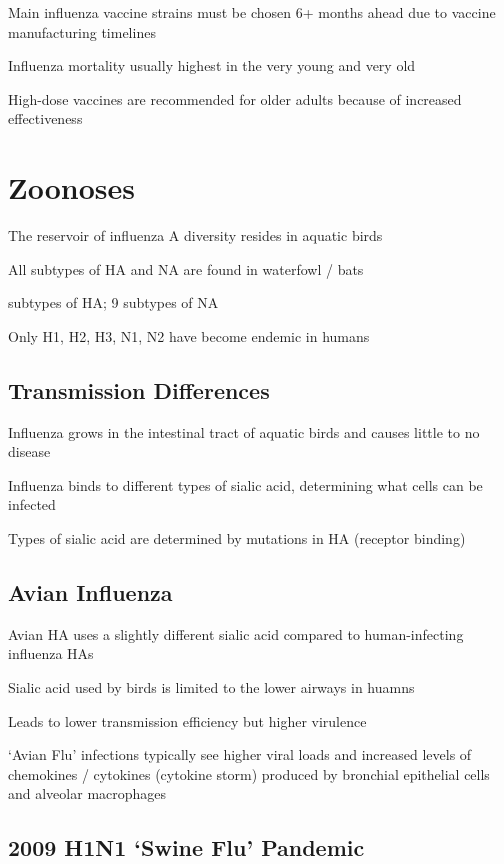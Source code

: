 \documentclass{notes}
\begin{document}
Main influenza vaccine strains must be chosen 6+ months ahead due to vaccine manufacturing timelines

Influenza mortality usually highest in the very young and very old

\tab High-dose vaccines are recommended for older adults because of increased effectiveness

\section{Zoonoses}

The reservoir of influenza A diversity resides in aquatic birds

\tab All subtypes of HA and NA are found in waterfowl / bats

\tab {} subtypes of HA; 9 subtypes of NA

Only H1, H2, H3, N1, N2 have become endemic in humans

\subsection{Transmission Differences}

Influenza grows in the intestinal tract of aquatic birds and causes little to no disease

Influenza binds to different types of sialic acid, determining what cells can be infected

\tab Types of sialic acid are determined by mutations in HA (receptor binding)

\subsection{Avian Influenza}

Avian HA uses a slightly different sialic acid compared to human-infecting influenza HAs

\tab Sialic acid used by birds is limited to the lower airways in huamns

\tab \indicates Leads to lower transmission efficiency but higher virulence

`Avian Flu' infections typically see higher viral loads and increased levels of chemokines / cytokines (cytokine storm) produced by bronchial epithelial cells and alveolar macrophages


\subsection{2009 H1N1 `Swine Flu' Pandemic}
\end{document}
